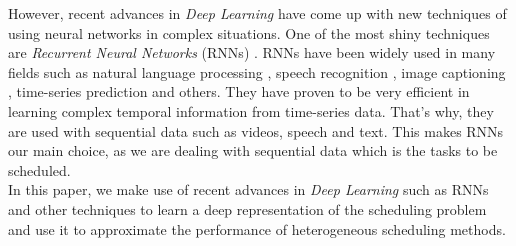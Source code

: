 However, recent advances in \emph{Deep Learning} have come up with new techniques of using neural networks in complex situations. One of the most shiny techniques are \emph{Recurrent Neural Networks} (RNNs) \cite{chung2014empirical}. RNNs have been widely used in many fields such as natural language processing \cite{bahdanau2014neural}, speech recognition \cite{DBLP:journals/corr/AmodeiABCCCCCCD15}, image captioning \cite{DBLP:journals/corr/abs-1810-04020}, time-series prediction \cite{prasad2014deep} and others. They have proven to be very efficient in learning complex temporal information from time-series data. That's why, they are used with sequential data such as videos, speech and text. This makes RNNs our main choice, as we are dealing with sequential data which is the tasks to be scheduled.\\

In this paper, we make use of recent advances in \emph{Deep Learning} such as RNNs and other techniques to learn a deep representation of the scheduling problem and use it to approximate the performance of heterogeneous scheduling methods. 
